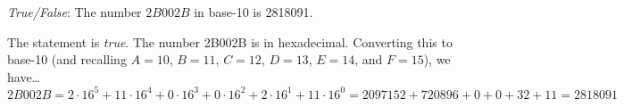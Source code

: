 \documentclass[11pt,letterpaper]{article}
\begin{document}
\quizsol \textit{True/False}: The number $2B002B$ in base-10 is 2818091. \pspace 

\sol The statement is \textit{true}. The number 2B002B is in hexadecimal. Converting this to base-10 (and recalling $A= 10$, $B= 11$, $C= 12$, $D= 13$, $E= 14$, and $F= 15$), we have\dots
	\[
	2B002B= 2 \cdot 16^5 + 11 \cdot 16^4 + 0 \cdot 16^3 + 0 \cdot 16^2 + 2 \cdot 16^1 + 11 \cdot 16^0= 2097152 + 720896 + 0 + 0 + 32 + 11= 2818091
	\]
\end{document}
